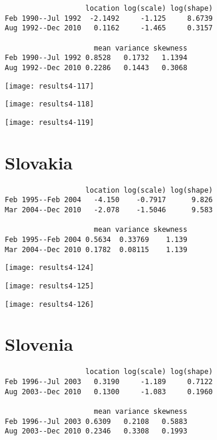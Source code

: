 \documentclass[a4paper]{article}
\begin{document}
\begin{verbatim}
                   location log(scale) log(shape)
Feb 1990--Jul 1992  -2.1492     -1.125     8.6739
Aug 1992--Dec 2010   0.1162     -1.465     0.3157

                     mean variance skewness
Feb 1990--Jul 1992 0.8528   0.1732   1.1394
Aug 1992--Dec 2010 0.2286   0.1443   0.3068

\end{verbatim}

\begin{center}
\texttt{[image: results4-117]}

\texttt{[image: results4-118]}

\texttt{[image: results4-119]}
\end{center}


\newpage

\section*{Slovakia}


\begin{verbatim}
                   location log(scale) log(shape)
Feb 1995--Feb 2004   -4.150    -0.7917      9.826
Mar 2004--Dec 2010   -2.078    -1.5046      9.583

                     mean variance skewness
Feb 1995--Feb 2004 0.5634  0.33769    1.139
Mar 2004--Dec 2010 0.1782  0.08115    1.139

\end{verbatim}

\begin{center}
\texttt{[image: results4-124]}

\texttt{[image: results4-125]}

\texttt{[image: results4-126]}
\end{center}


\newpage

\section*{Slovenia}


\begin{verbatim}
                   location log(scale) log(shape)
Feb 1996--Jul 2003   0.3190     -1.189     0.7122
Aug 2003--Dec 2010   0.1300     -1.083     0.1960

                     mean variance skewness
Feb 1996--Jul 2003 0.6309   0.2108   0.5883
Aug 2003--Dec 2010 0.2346   0.3308   0.1993

\end{verbatim}
\end{document}
